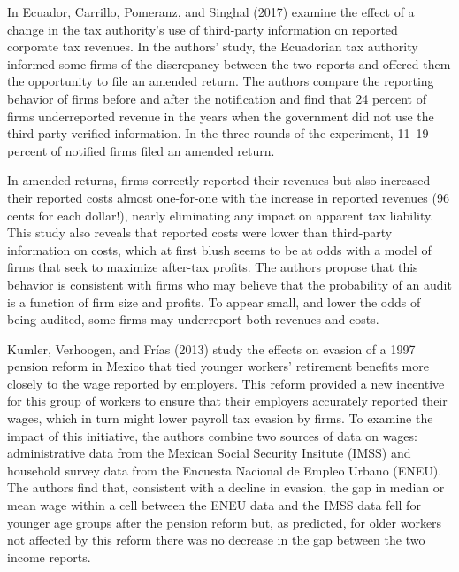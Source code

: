 \documentclass[
  12pt]{article}
\theoremstyle{definition}
\theoremstyle{remark}
\begin{document}
In Ecuador, Carrillo, Pomeranz, and Singhal (2017) examine the effect of
a change in the tax authority's use of third-party information on
reported corporate tax revenues. In the authors' study, the Ecuadorian
tax authority informed some firms of the discrepancy between the two
reports and offered them the opportunity to file an amended return. The
authors compare the reporting behavior of firms before and after the
notification and find that 24 percent of firms underreported revenue in
the years when the government did not use the third-party-verified
information. In the three rounds of the experiment, 11--19 percent of
notified firms filed an amended return.

In amended returns, firms correctly reported their revenues but also
increased their reported costs almost one-for-one with the increase in
reported revenues (96 cents for each dollar!), nearly eliminating any
impact on apparent tax liability. This study also reveals that reported
costs were lower than third-party information on costs, which at first
blush seems to be at odds with a model of firms that seek to maximize
after-tax profits. The authors propose that this behavior is consistent
with firms who may believe that the probability of an audit is a
function of firm size and profits. To appear small, and lower the odds
of being audited, some firms may underreport both revenues and costs.

Kumler, Verhoogen, and Frías (2013) study the effects on evasion of a
1997 pension reform in Mexico that tied younger workers' retirement
benefits more closely to the wage reported by employers. This reform
provided a new incentive for this group of workers to ensure that their
employers accurately reported their wages, which in turn might lower
payroll tax evasion by firms. To examine the impact of this initiative,
the authors combine two sources of data on wages: administrative data
from the Mexican Social Security Insitute (IMSS) and household survey
data from the Encuesta Nacional de Empleo Urbano (ENEU). The authors
find that, consistent with a decline in evasion, the gap in median or
mean wage within a cell between the ENEU data and the IMSS data fell for
younger age groups after the pension reform but, as predicted, for older
workers not affected by this reform there was no decrease in the gap
between the two income reports.
\end{document}

